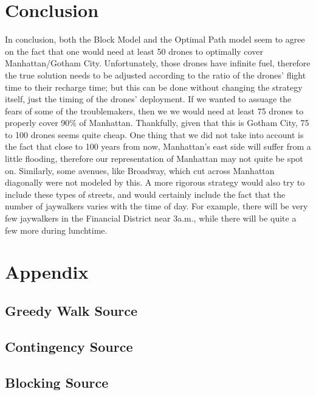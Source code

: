 \documentclass{article}
\begin{document}
\section{Conclusion}
\label{sec:conclusion}
In conclusion, both the Block Model and the Optimal Path model seem to agree on the fact that one would need at least 50 drones to optimally cover Manhattan/Gotham City. Unfortunately, those drones have infinite fuel, therefore the true solution needs to be adjusted according to the ratio of the drones' flight time to their recharge time; but this can be done without changing the strategy itself, just the timing of the drones' deployment. If we wanted to assuage the fears of some of the troublemakers, then we we would need at least 75 drones to properly cover 90\% of Manhattan. Thankfully, given that this is Gotham City, 75 to 100 drones seems quite cheap. One thing that we did not take into account is the fact that close to 100 years from now, Manhattan's east side will suffer from a little flooding, therefore our representation of Manhattan may not quite be spot on. Similarly, some avenues, like Broadway, which cut across Manhattan diagonally were not modeled by this. A more rigorous strategy would also try to include these types of streets, and would certainly include the fact that the number of jaywalkers varies with the time of day. For example, there will be very few jaywalkers in the Financial District near 3a.m., while there will be quite a few more during lunchtime.

\section{Appendix}
\label{sec:appendix}

\subsection{Greedy Walk Source}
\label{sub:greedy_walk_source}



\subsection{Contingency Source}
\label{sub:contingency_source}


\subsection{Blocking Source}
\label{sub:blocking_source}


\end{document}
